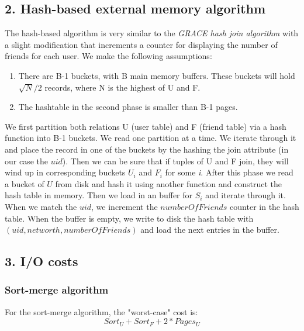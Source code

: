 \documentclass{article}      %
\begin{document}
\subsection* {2. Hash-based external memory algorithm}

The hash-based algorithm is very similar to the \emph{GRACE hash join algorithm} with a slight modification that increments a counter for displaying the number of friends for each user. We make the following assumptions:

\begin{enumerate}
\item 
There are B-1 buckets, with B main memory buffers. These buckets will hold \begin{math}\sqrt{N}/2\end{math} records, where N is the highest of U and F. 
\item
The hashtable in the second phase is smaller than B-1 pages.
\end{enumerate}

We first partition both relations U (user table) and F (friend table) via a hash function into B-1 buckets. We read one partition at a time. We iterate through it and place the record in one of the buckets by the hashing the join attribute (in our case the $uid$). Then we can be sure that if tuples of U and F join, they will wind up in corresponding buckets $U_i$ and $F_i$ for some \emph{i}. After this phase we read a bucket of $U$ from disk and hash it using another function and construct the hash table in memory. Then we load in an buffer for $S_i$ and iterate through it. When we match the $uid$, we increment the $numberOfFriends$ counter in the hash table. When the buffer is empty, we write to disk the hash table with $(uid, networth, numberOfFriends)$ and load the next entries in the buffer.\\

\subsection* {3. I/O costs}

\subsubsection* {Sort-merge algorithm}

For the sort-merge algorithm, the "worst-case" cost is:
\begin{equation}
Sort_U + Sort_F + 2* Pages_U 
\end{equation}
\end{document}
